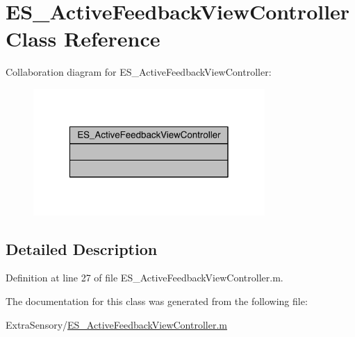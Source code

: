 \hypertarget{class_e_s___active_feedback_view_controller}{\section{E\+S\+\_\+\+Active\+Feedback\+View\+Controller Class Reference}
\label{class_e_s___active_feedback_view_controller}
}


Collaboration diagram for E\+S\+\_\+\+Active\+Feedback\+View\+Controller\+:\nopagebreak
\begin{figure}[H]
\begin{center}
\leavevmode
\includegraphics[width=250pt]{df/d11/class_e_s___active_feedback_view_controller__coll__graph}
\end{center}
\end{figure}


\subsection{Detailed Description}


Definition at line 27 of file E\+S\+\_\+\+Active\+Feedback\+View\+Controller.\+m.



The documentation for this class was generated from the following file\+:\begin{DoxyCompactItemize}
\item 
Extra\+Sensory/\hyperlink{_e_s___active_feedback_view_controller_8m}{E\+S\+\_\+\+Active\+Feedback\+View\+Controller.\+m}\end{DoxyCompactItemize}
